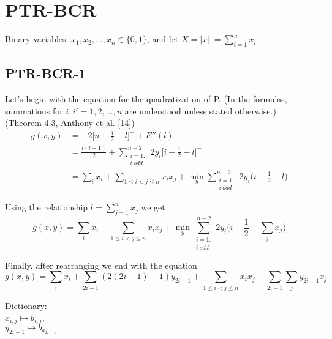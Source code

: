\documentclass[a4paper,11pt]{article}
\begin{document}
\section{PTR-BCR}

Binary variables: $x_1,x_2,\dots,x_n\in\{0,1\}$,
and let $X = |x|:=\sum_{i=1}^n x_i$
\subsection{PTR-BCR-1}

Let's begin with the equation for the quadratization of P. (In the formulas, summations for $i,i' = 1,2,\dots,n$ are understood unless stated otherwise.)\\(Theorem 4.3, Anthony et al. [14])
\begin{equation}
\begin{split}
  \left.
  g(x,y)
  \right.
  &= -2\Big[n - \frac{1}{2} - l\Big]^{-} + E''(l)\\
  &= \frac{l(l+1)}{2} + \sum_{\substack{i = 1:\\ i\:odd}}^{n-2}2y_i\Big[i-\frac{1}{2}-l\Big]^-\\
  &= \sum_i x_i + \sum_{1\leq i<j\leq n}x_ix_j + \mathop{min}_{y}\sum_{\substack{i = 1:\\ i\:odd}}^{n-2}2y_i\Big(i-\frac{1}{2}-l\Big)
  \end{split}
\end{equation}

\noindent Using the relationship $l = \sum_{j=1}^n x_j$ we get
\begin{equation}
  g(x,y) = \sum_i x_i + \sum_{1\leq i<j\leq n}x_ix_j + \mathop{min}_{y}\sum_{\substack{i = 1:\\ i\:odd}}^{n-2}2y_i\Big(i-\frac{1}{2}-\sum_j x_j\Big)
\end{equation}

\noindent Finally, after rearranging we end with the equation
\begin{equation}
  g(x,y) = \sum_i x_i + \sum_{2i - 1}(2(2i - 1)-1)y_{2i - 1} + \sum_{1\leq i<j\leq n}x_ix_j - \sum_{2i - 1}\sum_jy_{2i - 1} x_j
\end{equation}

\noindent Dictionary:\\
$x_{i,j}\mapsto b_{i,j}$,\\
$y_{2i-1}\mapsto b_{a_{2i-1}}$\\

\end{document}

